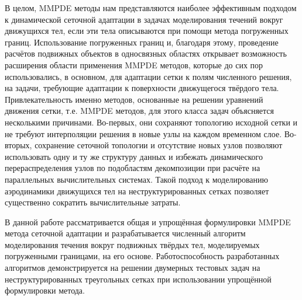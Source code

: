 	В целом, MMPDE методы нам представляются наиболее эффективным подходом к динамической сеточной адаптации в задачах моделирования течений вокруг движущихся тел, если эти тела описываются при помощи метода погруженных границ. Использование погруженных границ и, благодаря этому, проведение расчётов подвижных объектов в односвязных областях открывает возможность расширения области применения MMPDE методов, которые до сих пор использовались, в основном, для адаптации сетки к полям численного решения, на задачи, требующие адаптации к поверхности движущегося твёрдого тела. Привлекательность именно методов, основанные на решении уравнений движения сетки, т.е. MMPDE методов, для этого класса задач объясняется несколькими причинами. Во-первых, они сохраняют топологию исходной сетки и не требуют интерполяции решения в новые узлы на каждом временном слое. Во-вторых, сохранение сеточной топологии и отсутствие новых узлов позволяют использовать одну и ту же структуру данных и избежать динамического перераспределения узлов по подобластям декомпозиции при расчёте на параллельных вычислительных системах. Такой подход к моделированию аэродинамики движущихся тел на неструктурированных сетках позволяет существенно сократить вычислительные затраты.
	
	В данной работе рассматривается общая и упрощённая формулировки MMPDE метода сеточной адаптации и разрабатывается численный алгоритм моделирования течения вокруг подвижных твёрдых тел, моделируемых погруженными границами, на его основе. Работоспособность разработанных алгоритмов демонстрируется на решении двумерных тестовых задач на неструктурированных треугольных сетках при использовании упрощённой формулировки метода.


%


